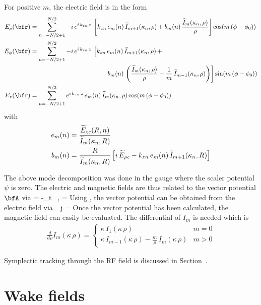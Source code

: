 For positive $m$, the electric field is in the form
\begin{align}
  E_\rho(\bfr) &= \sum_{n=-N/2+1}^{N/2}
    -i \, e^{i \, k_{zn} \, z} \, 
    \left[ 
    k_{zn} \, e_m(n) \, \wt I_{m+1}(\kappa_n, \rho) +
    b_m(n) \, \frac{\wt I_m(\kappa_n, \rho)}{\rho}
    \right]
    \cos(m \, (\phi - \phi_0)) \CRNO
  E_\phi(\bfr) &= \sum_{n=-N/2+1}^{N/2} 
    -i \, e^{i \, k_{zn} \, z} \, 
    \left[
    k_{zn} \, e_m(n) \, \wt I_{m+1}(\kappa_n, \rho) \, + \right. \\
  & \left. \qquad \qquad \qquad \qquad \qquad \qquad
    b_m(n) \, \left( \frac{\wt I_m(\kappa_n, \rho)}{\rho} - 
    \frac{1}{m} \, \wt I_{m-1}(\kappa_n, \rho) \right)
    \right] 
    \sin(m \, (\phi - \phi_0)) \CRNO
  E_z(\bfr) &= \sum_{n=-N/2+1}^{N/2}e^{i \, k_{zn} \, z} \, 
    e_m(n) \, \wt I_m(\kappa_n, \rho) \cos(m \, (\phi - \phi_0)) \nonumber
\end{align}
with
\begin{align}
  e_m(n) &= \frac{\widetilde E_{zc}(R, n)}{\widetilde I_m(\kappa_n, R)} \nonumber \\
  b_m(n) &= \frac{R}{\widetilde I_m(\kappa_n, R)} \left[
    i \, \widetilde E_{\rho c} - k_{zn} \, e_m(n) \, \widetilde I_{m+1}(\kappa_n, R)
    \right]
\end{align}

The above mode decomposition was done in the gauge where the scaler
potential $\psi$ is zero. The electric and magnetic fields are thus
related to the vector potential $\bfA$ via
\Begineq
  \bfE = -\partial_t \, \bfA, \qquad \bfB = \nabla \times \bfA
\Endeq
Using , the vector potential can be obtained from the
electric field via
\Begineq
  \bfA_j = 
  \label{aiew}
\Endeq
Once the vector potential has been calculated, the magnetic field can
easily be evaluated. The differential of $I_m$ is needed which is
\begin{align}
  \frac{d}{d\rho} I_m(\kappa \, \rho) = \begin{cases}
    \kappa \, I_1(\kappa \, \rho)  & m = 0 \\
    \kappa \, I_{m-1}(\kappa \, \rho) - \frac{m}{\rho} \, I_m(\kappa \, \rho) & m > 0
  \end{cases}
\end{align}
 
Symplectic tracking through the RF field is discussed in Section~.

\section{Wake fields}
\label{s:wake.fields}

